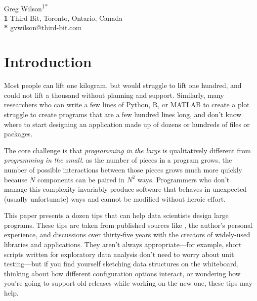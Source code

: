 \documentclass[10pt,letterpaper]{article}
\begin{document}
\vspace*{0.2in}

\begin{flushleft}
{\Large
\textbf{}
}
\newline
\\
{Greg Wilson}\textsuperscript{1*}
\\
\bigskip
\textbf{1} \colorbox{green!30}{Third Bit, Toronto, Ontario, Canada}\\
\textbf{*} \colorbox{green!30}{gvwilson@third-bit.com}
\end{flushleft}

\section*{Introduction}

Most people can lift one kilogram,
but would struggle to lift one hundred,
and could not lift a thousand without planning and support.
Similarly,
many researchers who can write a few lines of Python, R, or MATLAB to create a plot
struggle to create programs that are a few hundred lines long,
and don't know where to start designing an application made up of
dozens or hundreds of files or packages.

The core challenge is that
\emph{programming in the large} is qualitatively different from \emph{programming in the small}.
as the number of pieces in a program grows,
the number of possible interactions between those pieces grows much more quickly
because $N$ components can be paired in $N^2$ ways.
Programmers who don't manage this complexity
invariably produce software that behaves in unexpected (usually unfortunate) ways
and cannot be modified without heroic effort.

This paper presents a dozen tips that can help data scientists design large programs.
These tips are taken from published sources like \cite{Kernighan1999,Budgen2020},
the author's personal experience,
and discussions over thirty-five years with the creators of widely-used libraries and applications.
They aren't always appropriate---for example,
short scripts written for exploratory data analysis
don't need to worry about unit testing---but
if you find yourself sketching data structures on the whiteboard,
thinking about how different configuration options interact,
or wondering how you're going to support old releases while working on the new one,
these tips may help.
\end{document}
